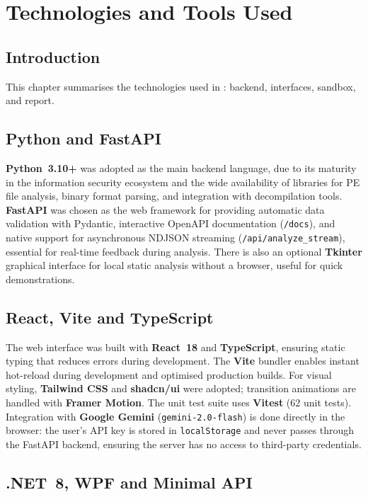 \chapter{Technologies and Tools Used}
\label{ch:tecnologias}

\section{Introduction}

This chapter summarises the technologies used in \rat: backend, interfaces, sandbox, and report.

\section{Python and FastAPI}

\textbf{Python~3.10+} was adopted as the main backend language, due to its maturity in the
information security ecosystem and the wide availability of libraries for PE file analysis,
binary format parsing, and integration with decompilation tools.
\textbf{FastAPI} \cite{fastapi2024} was chosen as the web framework for providing automatic
data validation with Pydantic, interactive OpenAPI documentation (\texttt{/docs}), and native
support for asynchronous NDJSON streaming (\texttt{/api/analyze\_stream}), essential for
real-time feedback during analysis. There is also an optional \textbf{Tkinter} graphical interface
for local static analysis without a browser, useful for quick demonstrations.

\section{React, Vite and TypeScript}

The web interface was built with \textbf{React~18} and \textbf{TypeScript}, ensuring static
typing that reduces errors during development. The \textbf{Vite} bundler enables instant hot-reload
during development and optimised production builds. For visual styling,
\textbf{Tailwind CSS} and \textbf{shadcn/ui} were adopted; transition animations are handled
with \textbf{Framer Motion}. The unit test suite uses \textbf{Vitest} (62 unit tests).
Integration with \textbf{Google Gemini} (\texttt{gemini-2.0-flash}) is done directly in the
browser: the user's API key is stored in \texttt{localStorage} and never passes through the
FastAPI backend, ensuring the server has no access to third-party credentials.

\section{.NET~8, WPF and Minimal API}

